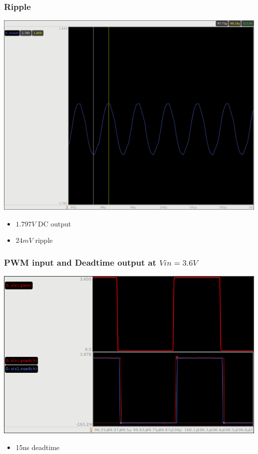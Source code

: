\documentclass{beamer}
\begin{document}
\begin{frame}
  \frametitle{Ripple}
  \includegraphics[scale=0.23]{ripple.png}
  \begin{itemize}
  \item $1.797 V$ DC output
  \item $24 mV$ ripple
  \end{itemize}
\end{frame}

\begin{frame}
  \frametitle{PWM input and Deadtime output at $Vin = 3.6V$}
  \includegraphics[scale=0.25]{pwm-deadtime.png}
  \begin{itemize}
  \item 15ns deadtime 
  \end{itemize}
\end{frame}
\end{document}
